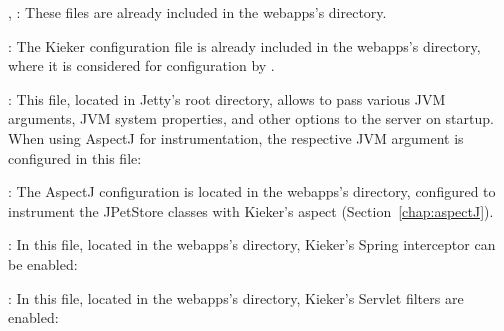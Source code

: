 \begin{compactenum}
 \item \file{\aspectJWeaverJar{}}, \file{\mainJar}: These files are already %
included in the webapps's  directory.
 \item \file{\monitoringPropertiesFile}: The Kieker configuration file is %
already included in the webapps's  directory, %
where it is considered for configuration by \KiekerMonitoringPart{}. 
 \item {}: This file, located in Jetty's root directory, allows %
to pass various JVM arguments, JVM system properties, and other options to the %
server on startup. When using AspectJ for instrumentation, the respective %
JVM argument is configured in this file: %

\setPropertiesListing


 \item {}: The AspectJ configuration is located in the %
webapps's  directory, configured to instrument %
the JPetStore classes with Kieker's  aspect %
(Section~\ref{chap:aspectJ}).
\item {}: In this file, located in the webapps's %
 directory, Kieker's Spring interceptor can be enabled: 

\setXMLListing


 \item {}: In this file, located in the webapps's %
 directory, Kieker's Servlet filters are enabled: 

\setXMLListing

\end{compactenum}



